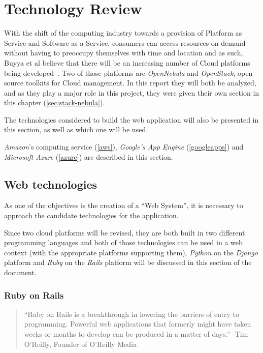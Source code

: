 \section{Technology Review}\label{sec:developments-apps-services}

With the shift of the computing industry towards a provision of Platform as Service and Software as a Service, consumers can access resources on-demand without having to preoccupy themselves with time and location and as such, Buyya et al believe that there will be an increasing number of Cloud platforms being developed~\cite{Buyya2009599}. Two of those platforms are \textit{OpenNebula} and \textit{OpenStack}, open-source toolkits for Cloud management. In this report they will both be analyzed, and as they play a major role in this project, they were given their own section in this chapter (\ref{sec:stack-nebula}).

The technologies considered to build the web application will also be presented in this section, as well as which one will be used.

\textit{Amazon}'s computing service (\ref{aws}), \textit{Google's App Engine} (\ref{googleapps}) and \textit{Microsoft Azure} (\ref{azure}) are described in this section.

\subsection{Web technologies}\label{subsec:web-tech}

As one of the objectives is the creation of a ``Web System'', it is necessary to approach the candidate technologies for the application.

Since two cloud platforms will be revised, they are both built in two different programming languages and both of those technologies can be used in a web context (with the appropriate platforms supporting them), \textit{Python} on the \textit{Django} platform and \textit{Ruby} on the \textit{Rails} platform will be discussed in this section of the document.

\subsubsection{Ruby on Rails}\label{ruby}

\begin{quote}
``Ruby on Rails is a breakthrough in lowering the barriers of entry to programming. Powerful web applications that formerly might have taken weeks or months to develop can be produced in a matter of days.'' -Tim O’Reilly, Founder of O’Reilly Media~\cite{rubyonrails}
\end{quote}

